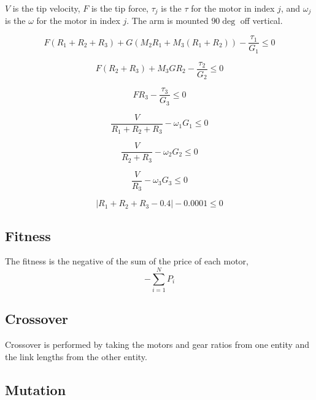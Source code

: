 \documentclass{article}
\begin{document}
$V$ is the tip velocity, $F$ is the tip force, $\tau_j$ is the $\tau$ for the
motor in index $j$, and $\omega_j$ is the $\omega$ for the motor in index $j$.
The arm is mounted $90 \deg$ off vertical.

\begin{equation}
    F(R_1 + R_2 + R_3) + G (M_2 R_1 + M_3 (R_1 + R_2)) - \frac{\tau_1}{G_1} \leq 0
\end{equation}

\begin{equation}
    F(R_2 + R_3) + M_3 G R_2 - \frac{\tau_2}{G_2} \leq 0
\end{equation}

\begin{equation}
    F R_3 - \frac{\tau_3}{G_3} \leq 0
\end{equation}

\begin{equation}
    \frac{V}{R_1 + R_2 + R_3} - \omega_1 G_1 \leq 0
\end{equation}

\begin{equation}
    \frac{V}{R_2 + R_3} - \omega_2 G_2 \leq 0
\end{equation}

\begin{equation}
    \frac{V}{R_3} - \omega_3 G_3 \leq 0
\end{equation}

\begin{equation}
    |R_1 + R_2 + R_3 - 0.4| - 0.0001 \leq 0
\end{equation}

\FloatBarrier{}
\subsection{Fitness}

The fitness is the negative of the sum of the price of each motor,
\begin{equation}
    -\sum_{i=1}^{N} P_i
\end{equation}

\FloatBarrier{}
\subsection{Crossover}

Crossover is performed by taking the motors and gear ratios from one entity and
the link lengths from the other entity.

\FloatBarrier{}
\subsection{Mutation}
\end{document}
